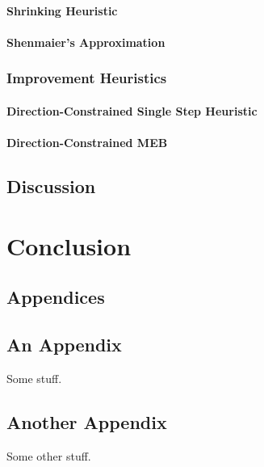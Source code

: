 \documentclass[11pt,twoside]{report}
\theoremstyle{definition}
\numberwithin{theorem}{section}
\numberwithin{definition}{section}
\numberwithin{lemma}{section}
\numberwithin{proposition}{section}
\numberwithin{equation}{section}
\numberwithin{figure}{section}
\begin{document}
\subsubsection{Shrinking Heuristic}
\subsubsection{Shenmaier's Approximation}

\subsection{Improvement Heuristics}
\subsubsection{Direction-Constrained Single Step Heuristic}
\subsubsection{Direction-Constrained MEB}

\section{Discussion}

\chapter{Conclusion}


\clearpage

\appendix
\section*{Appendices}

\section{An Appendix}
\label{app:one}

Some stuff.
\clearpage

\section{Another Appendix}
\label{app:two}

Some other stuff.
\end{document}

